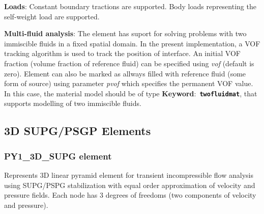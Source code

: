 \documentclass[a4paper]{article}
\newcommand{\descitem}[1]{{\noindent \bf #1}:}
\newcommand{\elemkeyword}[1]{\descitem{Keyword}~{\bf \texttt{#1}}}
\newcommand{\param}[1]{{\em #1}}
\begin{document}
\descitem{Loads} Constant boundary tractions are supported. Body loads
representing the self-weight load are supported.

\descitem{Multi-fluid analysis} The element has suport for solving
problems with two immiscible fluids in
a fixed spatial domain. In the present implementation, a VOF tracking algorithm
is used to track the position of interface. An initial VOF fraction
(volume fraction of reference fluid) can be specified using
\param{vof} (default is zero). Element can also be marked as allways
filled with reference fluid (some form of source) using parameter
\param{pvof} which specifies the permanent VOF value. In this case,
the material model should be of type \elemkeyword{twofluidmat}, that
supports modelling of two immiscible fluids.

\subsection{3D SUPG/PSGP Elements}
\subsubsection{PY1\_3D\_SUPG element}
\label{PY1_3D_SUPG}
Represents 3D linear pyramid element for transient
incompressible flow analysis using SUPG/PSPG stabilization with equal order
approximation of velocity and pressure fields. Each node has 3 degrees
of freedoms (two components of velocity and pressure).
\end{document}
